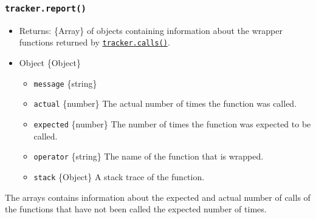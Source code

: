 \subsubsection{\texorpdfstring{\texttt{tracker.report()}}{tracker.report()}}\label{tracker.report}

\begin{itemize}
\tightlist
\item
  Returns: \{Array\} of objects containing information about the wrapper
  functions returned by
  \hyperref[trackercallsfn-exact]{\texttt{tracker.calls()}}.
\item
  Object \{Object\}

  \begin{itemize}
  \tightlist
  \item
    \texttt{message} \{string\}
  \item
    \texttt{actual} \{number\} The actual number of times the function
    was called.
  \item
    \texttt{expected} \{number\} The number of times the function was
    expected to be called.
  \item
    \texttt{operator} \{string\} The name of the function that is
    wrapped.
  \item
    \texttt{stack} \{Object\} A stack trace of the function.
  \end{itemize}
\end{itemize}

The arrays contains information about the expected and actual number of
calls of the functions that have not been called the expected number of
times.

